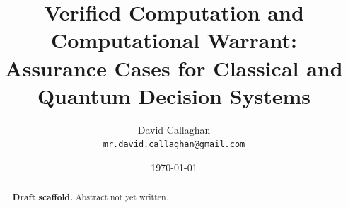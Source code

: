 \documentclass[11pt]{article}
\title{Verified Computation and Computational Warrant:\\ Assurance Cases for
       Classical and Quantum Decision Systems}
\author{%
  David Callaghan\\
  \texttt{mr.david.callaghan@gmail.com}
}
\date{\today}
\begin{document}
\maketitle

\begin{abstract}
\textbf{Draft scaffold.} Abstract not yet written.
\end{abstract}











%
% 
% 
\end{document}

